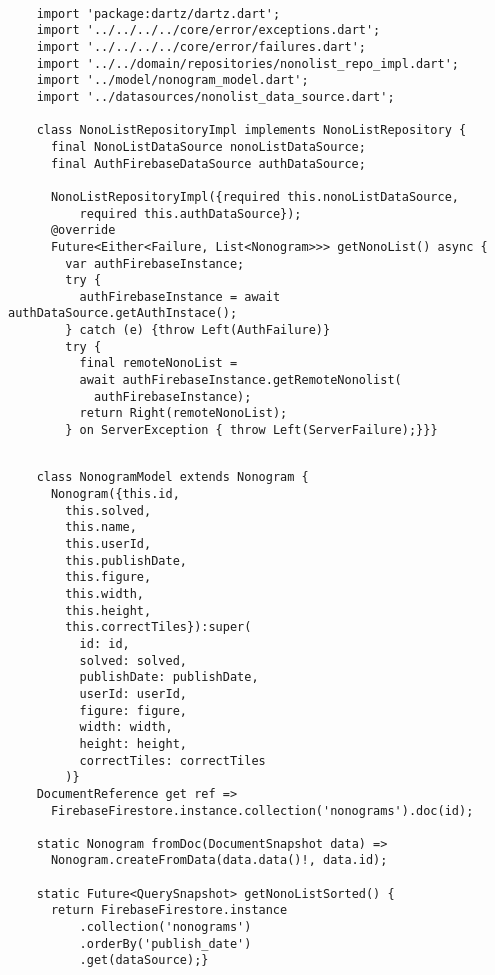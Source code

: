     \begin{lstlisting}
      
    import 'package:dartz/dartz.dart';
    import '../../../../core/error/exceptions.dart';
    import '../../../../core/error/failures.dart';
    import '../../domain/repositories/nonolist_repo_impl.dart';
    import '../model/nonogram_model.dart';
    import '../datasources/nonolist_data_source.dart';
    
    class NonoListRepositoryImpl implements NonoListRepository {
      final NonoListDataSource nonoListDataSource;
      final AuthFirebaseDataSource authDataSource;

      NonoListRepositoryImpl({required this.nonoListDataSource, 
          required this.authDataSource});
      @override
      Future<Either<Failure, List<Nonogram>>> getNonoList() async {
        var authFirebaseInstance;
        try {
          authFirebaseInstance = await authDataSource.getAuthInstace();
        } catch (e) {throw Left(AuthFailure)}
        try {
          final remoteNonoList = 
          await authFirebaseInstance.getRemoteNonolist(
            authFirebaseInstance);
          return Right(remoteNonoList);
        } on ServerException { throw Left(ServerFailure);}}}
    \end{lstlisting}

    \begin{lstlisting}

    class NonogramModel extends Nonogram {
      Nonogram({this.id,
        this.solved,
        this.name,
        this.userId,
        this.publishDate,
        this.figure, 
        this.width, 
        this.height, 
        this.correctTiles}):super(
          id: id,
          solved: solved,
          publishDate: publishDate,
          userId: userId,
          figure: figure,
          width: width,
          height: height,
          correctTiles: correctTiles
        )}
    DocumentReference get ref =>
      FirebaseFirestore.instance.collection('nonograms').doc(id);
      
    static Nonogram fromDoc(DocumentSnapshot data) =>
      Nonogram.createFromData(data.data()!, data.id);

    static Future<QuerySnapshot> getNonoListSorted() {
      return FirebaseFirestore.instance
          .collection('nonograms')
          .orderBy('publish_date')
          .get(dataSource);}
    \end{lstlisting}

